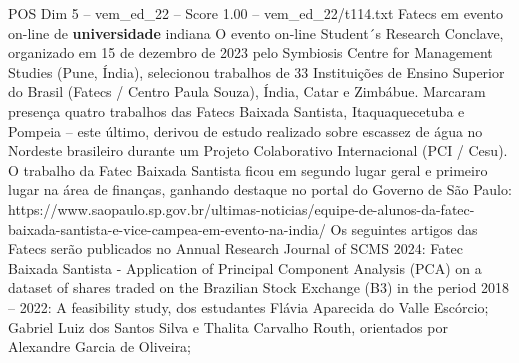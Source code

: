 \begin{textsample}{POS Dim 5 – vem\_ed\_22 – Score 1.00 – vem\_ed\_22/t114.txt}  \label{ex:f5_pos_097}
Fatecs em evento on-line de \textbf{universidade} indiana O evento on-line Student´s Research Conclave, organizado em 15 de dezembro de 2023 pelo Symbiosis Centre for Management Studies (Pune, Índia), selecionou trabalhos de 33 Instituições de Ensino Superior do Brasil (Fatecs / Centro Paula Souza), Índia, Catar e Zimbábue.
Marcaram presença quatro trabalhos das Fatecs Baixada Santista, Itaquaquecetuba e Pompeia – este último, derivou de estudo realizado sobre escassez de água no Nordeste brasileiro durante um Projeto Colaborativo Internacional (PCI / Cesu).
O trabalho da Fatec Baixada Santista ficou em segundo lugar geral e primeiro lugar na área de finanças, ganhando destaque no portal do Governo de São Paulo: https://www.saopaulo.sp.gov.br/ultimas-noticias/equipe-de-alunos-da-fatec-baixada-santista-e-vice-campea-em-evento-na-india/ Os seguintes artigos das Fatecs serão publicados no Annual Research Journal of SCMS 2024: Fatec Baixada Santista - Application of Principal Component Analysis (PCA) on a dataset of shares traded on the Brazilian Stock Exchange (B3) in the period 2018 – 2022: A feasibility study, dos estudantes Flávia Aparecida do Valle Escórcio; Gabriel Luiz dos Santos Silva e Thalita Carvalho Routh, orientados por Alexandre Garcia de Oliveira;

\end{textsample}
